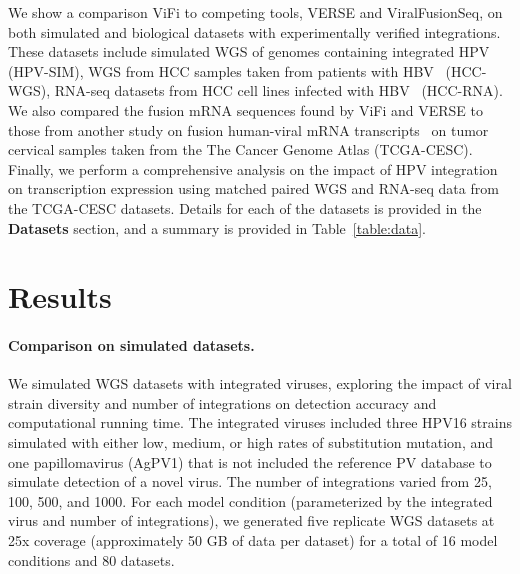 \documentclass[10pt]{article}
\begin{document}
We show a comparison ViFi to competing tools, VERSE and ViralFusionSeq, on both simulated and biological datasets with experimentally verified integrations.  These datasets include simulated WGS of genomes containing integrated HPV (HPV-SIM), WGS from HCC samples taken from patients with HBV~\cite{Sung2012} (HCC-WGS), RNA-seq datasets from HCC cell lines infected with HBV~\cite{Lau2014} (HCC-RNA).  We also compared the fusion mRNA sequences found by ViFi and VERSE to those from another study on fusion human-viral mRNA transcripts~\cite{Tang2013} on tumor cervical samples taken from the The Cancer Genome Atlas (TCGA-CESC).  Finally, we perform a comprehensive analysis on the impact of HPV integration on transcription expression using matched paired WGS and RNA-seq data from the TCGA-CESC datasets.  Details for each of the datasets is provided in the \textbf{Datasets} section, and a summary is provided in Table~\ref{table:data}. 


\section{Results}

\paragraph{\textbf{Comparison on simulated datasets.}}  We simulated WGS datasets with integrated viruses, exploring the impact of viral strain diversity and number of integrations on detection accuracy and computational running time.  The integrated viruses included three HPV16 strains simulated with either low, medium, or high rates of substitution mutation, and one papillomavirus (AgPV1) that is not included the reference PV database to simulate detection of a novel virus.  The number of integrations varied from 25, 100, 500, and 1000.  For each model condition (parameterized by the integrated virus and number of integrations), we generated five replicate WGS datasets at 25x coverage (approximately 50 GB of data per dataset) for a total of 16 model conditions and 80 datasets.  
\end{document}
